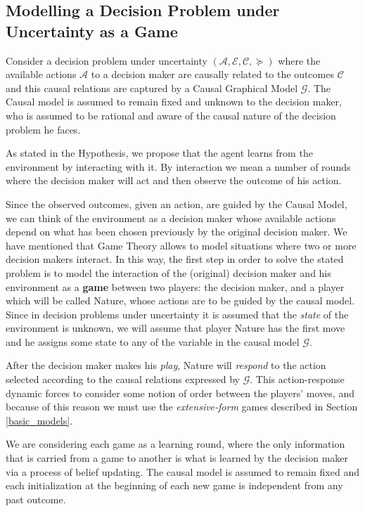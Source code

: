 \documentclass[english,letterpaper,12pt,final]{article}
\theoremstyle{definition}
\begin{document}
\subsection{Modelling a Decision Problem under Uncertainty as a Game}
Consider a decision problem under uncertainty $(\mathcal{A},\mathcal{E},\mathcal{C},\succeq)$ where the available actions $\mathcal{A}$ to a decision maker are causally related to the outcomes $\mathcal{C}$ and this causal relations are captured by a Causal Graphical Model $\mathcal{G}$. The Causal model is assumed to remain fixed and unknown to the decision maker, who is assumed to be rational and aware of the causal nature of the decision problem he faces.  

As stated in the Hypothesis, we propose that the agent learns from the environment by interacting with it. By interaction we mean a number of rounds where the decision maker will act and then observe the outcome of his action. 

Since the observed outcomes, given an action, are guided by the Causal Model, we can think of the environment as a decision maker whose available actions depend on what has been chosen previously by the original decision maker. We have mentioned that Game Theory allows to model situations where two or more decision makers interact. In this way, the first step in order to solve the stated problem is to model the interaction of the (original) decision maker and his environment as a \textbf{game} between two players: the decision maker, and a player which will be called Nature, whose actions are to be guided by the causal model. Since in decision problems under uncertainty it is assumed that the \textit{state} of the environment is unknown, we will assume that player Nature has the first move and he assigns some state to any of the variable in the causal model $\mathcal{G}$.

After the decision maker makes his \textit{play}, Nature will \textit{respond} to the action selected according to the causal relations expressed by $\mathcal{G}$. This action-response dynamic forces to consider some notion of order between the players' moves, and because of this reason we must use the \textit{extensive-form} games described in Section \ref{basic_models}.

We are considering each game as a learning round, where the only information that is carried from a game to another is what is learned by the decision maker via a process of belief updating. The causal model is assumed to remain fixed and each initialization at the beginning of each new game is independent from any past outcome.
\end{document}
